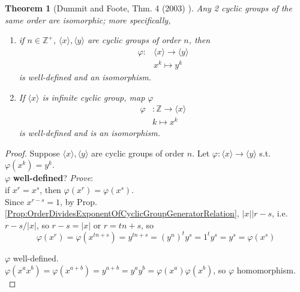 \documentclass[10pt]{amsart}
\newtheorem{theorem}{Theorem}
\begin{document}
\begin{multicols*}{2}
\begin{theorem}[Dummit and Foote, Thm. 4 (2003) \cite{DuFo2003}]\label{Thm:CyclicGroupSameOrderIsomorphism}
	Any 2 cyclic groups of the same order are isomorphic; more specifically, 
	\begin{enumerate}
		\item[(1)] if $n\in \mathbb{Z}^+$, $\langle x \rangle, \langle y \rangle$ are cyclic groups of order $n$, then
		\begin{equation}
			\begin{aligned}
				\varphi : & \langle x \rangle \to \langle y \rangle \\
				& x^k \mapsto y^k 
			\end{aligned}
		\end{equation}
		is well-defined and an isomorphism.
		\item[(2)] If $\langle x \rangle$ is infinite cyclic group, map $\varphi$ 
		\begin{equation}
			\begin{aligned}
				\varphi & : \mathbb{Z} \to \langle x \rangle \\
				& k \mapsto x^k
			\end{aligned}
		\end{equation}
		is well-defined and is an isomorphism.
	\end{enumerate}
\end{theorem} 

\begin{proof}
	Suppose $\langle x \rangle, \langle y \rangle$ are cyclic groups of order $n$. Let $\varphi: \langle x \rangle \to \langle y \rangle$ s.t. $\varphi(x^k) = y^k$. \\
	
	$\varphi$ \textbf{well-defined}? \emph{Prove}: \\
	if $x^r = x^s$, then $\varphi(x^r) = \varphi(x^s)$. \\
	
	Since $x^{r-s} = 1$, by Prop. \ref{Prop:OrderDividesExponentOfCyclicGroupGeneratorRelation}, $|x| | r-s$, i.e. $r-s / |x|$, so $r-s = |x|$ or $r = tn + s$, so 
	\[
	\varphi(x^r) = \varphi(x^{tn + s}) = y^{tn + s} = (y^n)^t y^s = 1^t y^s = y^s = \varphi(x^s)
	\]
	
	$\varphi$ well-defined. \\

$\varphi(x^a x^b) = \varphi(x^{a+b}) = y^{a+b} = y^a y^b = \varphi(x^a) \varphi(x^b)$, so $\varphi$ homomorphism.  \\


\end{proof}
\end{multicols*}
\end{document}
